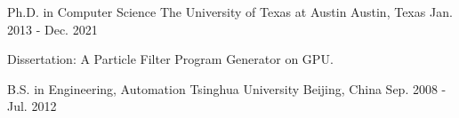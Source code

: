 

\begin{cventries}

  \cventry
  {Ph.D. in Computer Science} %
  {The University of Texas at Austin} %
  {Austin, Texas} %
  {Jan. 2013 - Dec. 2021} %
  {
    \begin{cvitems} %
    \item {Dissertation: A Particle Filter Program Generator on GPU.}
    \end{cvitems}
  }
  \cventry
  {B.S. in Engineering, Automation}
  {Tsinghua University}
  {Beijing, China}
  {Sep. 2008 - Jul. 2012}
  {}
  
\end{cventries}

